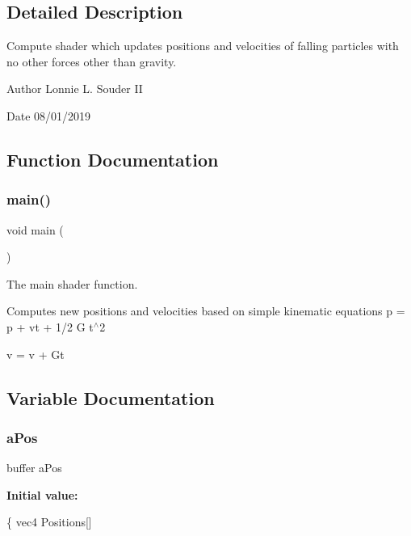 \subsection{Detailed Description}
Compute shader which updates positions and velocities of falling particles with no other forces other than gravity. 

\begin{DoxyAuthor}{Author}
Lonnie L. Souder II 
\end{DoxyAuthor}
\begin{DoxyDate}{Date}
08/01/2019 
\end{DoxyDate}


\subsection{Function Documentation}
\mbox{\label{particle_8comp_acdef7a1fd863a6d3770c1268cb06add3}} 
\subsubsection{\texorpdfstring{main()}{main()}}
{\footnotesize\ttfamily void main (\begin{DoxyParamCaption}{ }\end{DoxyParamCaption})}



The main shader function. 

Computes new positions and velocities based on simple kinematic equations p\textquotesingle{} = p + vt + 1/2 G t$^\wedge$2

v\textquotesingle{} = v + Gt 

\subsection{Variable Documentation}
\mbox{\label{particle_8comp_a9f39e8aaa860ed0953f27908a3b221d0}} 
\subsubsection{\texorpdfstring{a\+Pos}{aPos}}
{\footnotesize\ttfamily buffer a\+Pos}

{\bfseries Initial value\+:}
\begin{DoxyCode}
\{
    vec4 Positions[]
\end{DoxyCode}


